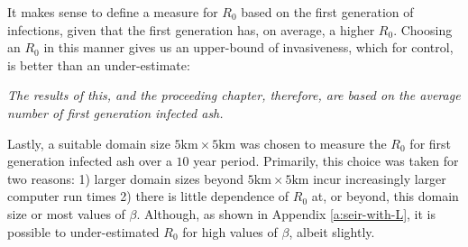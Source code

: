 It makes sense to define a measure for $R_0$ based on the first generation of infections, given that the first generation has, on average, a higher $R_0$. Choosing an $R_0$ in this manner gives us an upper-bound of invasiveness, which for control, is better than an under-estimate:

\textit{The results of this, and the proceeding chapter, therefore, are based on the average number of first generation infected ash.}

Lastly, a suitable domain size $5\mathrm{km} \times 5\mathrm{km}$ was chosen to measure the $R_0$ for first generation infected ash over a $10$ year period. Primarily, this choice was taken for two reasons: 1) larger domain sizes beyond $5\mathrm{km} \times 5\mathrm{km}$ incur increasingly larger computer run times 2) there is little dependence of $R_0$ at, or beyond, this domain size or most values of $\beta$. Although, as shown in Appendix \ref{a:seir-with-L}, it is possible to under-estimated $R_0$ for high values of $\beta$, albeit slightly.









